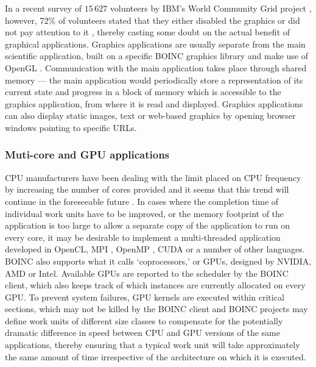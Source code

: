   In a  recent survey of $15\,627$ volunteers by IBM's World Community Grid project \cite{wcg}, however, 72\% of volunteers stated that they either disabled the graphics or did not pay attention to it  \cite{wcg2013}, thereby casting some doubt on the actual benefit of graphical applications. Graphics applications are usually separate from the main scientific application, built on  a specific  BOINC graphics library and make  use of OpenGL \cite{opengl}. Communication with the main application takes place through shared memory --- the main application would periodically store a representation of its current state and progress in  a block of memory which is accessible to the graphics application, from where it is read and displayed. Graphics applications can also display static images, text or web-based graphics by opening   browser windows pointing to   specific URLs.

\subsubsection{Muti-core and GPU applications} \label{Bopencl}
CPU manufacturers have been dealing with the limit placed on CPU frequency by increasing the number of cores provided and it seems that this trend will continue in the foreseeable future \cite{spu}. In cases where the completion time of individual work units have to be improved, or the memory footprint of the application is too large to allow a separate copy of the application to run on every core, it may be desirable to implement a multi-threaded application developed in OpenCL, MPI \cite{mpi}, OpenMP \cite{openMP}, CUDA  or a number of other languages. BOINC also supports what it calls `coprocessors,' or GPUs, designed by NVIDIA, AMD or Intel. Available GPUs are reported to the scheduler by the BOINC client, which also keeps track of which instances are currently allocated on every GPU. To prevent system failures, GPU kernels are  executed within critical sections, which may not be killed by the BOINC client and  BOINC projects may define work units of different size classes to compensate for the potentially dramatic difference in speed between CPU and GPU versions of the same applications,  thereby ensuring that a typical work unit will take approximately the same amount of time irrespective of the architecture on which it is executed.

